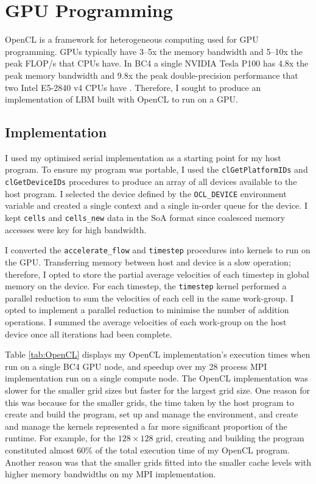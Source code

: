 \documentclass[twocolumn, a4paper]{article}
\begin{document}
\section{GPU Programming}

OpenCL is a framework for heterogeneous computing used for GPU programming.
GPUs typically have 3--5x the memory bandwidth and 5--10x the peak FLOP/s that CPUs have.
In BC4 a single NVIDIA Tesla P100 has 4.8x the peak memory bandwidth and 9.8x the peak double-precision performance that two Intel E5-2840 v4 CPUs have \cite{youtube}.
Therefore, I sought to produce an implementation of LBM built with OpenCL to run on a GPU.

\subsection{Implementation}

I used my optimised serial implementation as a starting point for my host program.
To ensure my program was portable, I used the \texttt{clGetPlatformIDs} and \texttt{clGetDeviceIDs} procedures to produce an array of all devices available to the host program.
I selected the device defined by the \texttt{OCL\_DEVICE} environment variable and created a single context and a single in-order queue for the device.
I kept \texttt{cells} and \texttt{cells\_new} data in the SoA format since coalesced memory accesses were key for high bandwidth.

I converted the \texttt{accelerate\_flow} and \texttt{timestep} procedures into kernels to run on the GPU.
Transferring memory between host and device is a slow operation; therefore, I opted to store the partial average velocities of each timestep in global memory on the device.
For each timestep, the \texttt{timestep} kernel performed a parallel reduction to sum the velocities of each cell in the same work-group.
I opted to implement a parallel reduction to minimise the number of addition operations.
I summed the average velocities of each work-group on the host device once all iterations had been complete.

Table \ref{tab:OpenCL} displays my OpenCL implementation's execution times when run on a single BC4 GPU node, and speedup over my 28 process MPI implementation run on a single compute node.
The OpenCL implementation was slower for the smaller grid sizes but faster for the largest grid size.
One reason for this was because for the smaller grids, the time taken by the host program to create and build the program, set up and manage the environment, and create and manage the kernels represented a far more significant proportion of the runtime.
For example, for the $128 \times 128$ grid, creating and building the program constituted almost 60\% of the total execution time of my OpenCL program.
Another reason was that the smaller grids fitted into the smaller cache levels with higher memory bandwidths on my MPI implementation.
\end{document}
